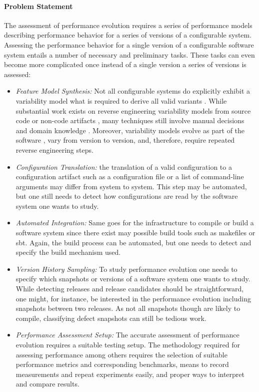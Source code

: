 \paragraph{Problem Statement}
The assessment of performance evolution requires a series of performance models
describing performance behavior for a series of versions of a configurable
system. Assessing the performance behavior for a single version of a
configurable software system entails a number of necessary and preliminary
tasks. These tasks can even become more complicated once instead of a single
version a series of versions is assessed:
\begin{itemize}
  \item \emph{Feature Model Synthesis:} Not all configurable systems do
  explicitly exhibit a variability model what is required to derive all valid variants
	\citep{rabkin_static_2011,nadi_where_2015}.
	While substantial work exists on reverse engineering variability models from
	source
	\citep{rabkin_static_2011,she_reverse_2011,zhou_extracting_2015,nadi_where_2015}
	code or non-code artifacts
	\citep{alves_exploratory_2008,andersen_efficient_2012,bakar_feature_2015}, many
	techniques still involve manual decisions \citep{she_reverse_2011} and domain
	knowledge \citep{nadi_where_2015}.
	Moreover, variability models evolve as part of the software
	\citep{peng_analyzing_2011}, vary from version to version, and, therefore,
	require repeated reverse engineering steps.
	
	\item \emph{Configuration Translation:} the translation of a valid
	configuration to a configuration artifact such as a configuration file or a list of command-line arguments may differ
from system to system. This step may be automated, but one still needs to
detect how configurations are read by the software system one wants to study.

\item \emph{Automated Integration:} Same goes for the infrastructure to
compile or build a software system since there exist may possible build tools such as makefiles or sbt.
Again, the build process can be automated, but one needs to detect and
specify the build mechanism used.

\item \emph{Version History Sampling:} To study performance evolution one
needs to specify which snapshots or versions of a software system one wants to study. While detecting
releases and release candidates should be straightforward, one might, for
instance, be interested in the performance evolution including snapshots
between two releases. As not all snapshots though are likely to compile,
classifying defect snapshots can still be tedious work.
\item \emph{Performance Assessment Setup:} The accurate assessment of
performance evolution requires a suitable testing setup. The methodology required for assessing performance
among others requires the selection of suitable performance metrics and
corresponding benchmarks, means to record measurements and repeat experiments
easily, and proper ways to interpret and compare results.
\end{itemize}

